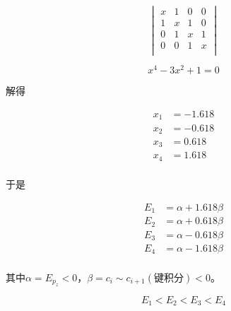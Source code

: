 \begin{equation*}
    \begin{vmatrix*}
        x & 1 & 0 & 0 \\
        1 & x & 1 & 0 \\
        0 & 1 & x & 1 \\
        0 & 0 & 1 & x \\
    \end{vmatrix*}
\end{equation*}


\begin{equation*}
    x^4 - 3x^2 + 1 = 0
\end{equation*}

解得

\begin{align*}
    x_1 &= -1.618 \\ 
    x_2 &= -0.618 \\
    x_3 &= 0.618 \\
    x_4 &= 1.618 \\
\end{align*}

于是

\begin{align*}
    E_1 &= \alpha + 1.618\beta \\ 
    E_2 &= \alpha + 0.618\beta \\
    E_3 &= \alpha - 0.618\beta \\
    E_4 &= \alpha - 1.618\beta \\
\end{align*}

其中$\alpha = E_{p_z} < 0$，$\beta = c_i \sim c_{i+1} (\mbox{键积分}) < 0$。


\begin{equation*}
    E_1 < E_2 < E_3 < E_4
\end{equation*}
